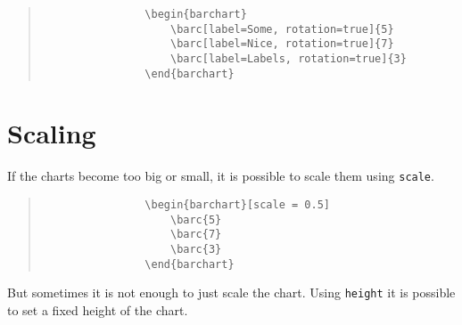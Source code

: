 \documentclass[]{article}
\begin{document}
\begin{center}
	\begin{minipage}[l][][c]{0.45\linewidth} 
		\begin{quote}\small
			\begin{verbatim}
				\begin{barchart}
				    \barc[label=Some, rotation=true]{5}
				    \barc[label=Nice, rotation=true]{7}
				    \barc[label=Labels, rotation=true]{3}
				\end{barchart}
			\end{verbatim}
		\end{quote}
	\end{minipage}
	\quad
	\begin{minipage}[r][][c]{0.45\linewidth}
		\begin{barchart}
		\end{barchart}
	\end{minipage}
\end{center}

\section{Scaling}
If the charts become too big or small, it is possible to scale them using \texttt{scale}. 
\begin{center}
	\begin{minipage}[l][][c]{0.45\linewidth} 
		\begin{quote}\small
			\begin{verbatim}
				\begin{barchart}[scale = 0.5]
				    \barc{5}
				    \barc{7}
				    \barc{3}
				\end{barchart}
			\end{verbatim}
		\end{quote}
	\end{minipage}
	\quad
	\begin{minipage}[r][][c]{0.45\linewidth}
		\begin{barchart}[scale=0.5]
		\end{barchart}
	\end{minipage}
\end{center}

But sometimes it is not enough to just scale the chart. Using \texttt{height} it is possible to set a fixed height of the chart. 
\end{document}
